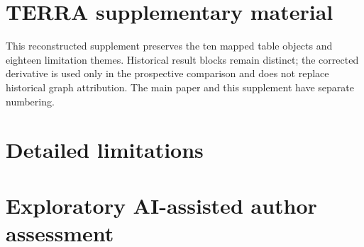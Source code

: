 \documentclass[10pt]{article}
\begin{document}
\section*{TERRA supplementary material}
This reconstructed supplement preserves the ten mapped table objects and eighteen limitation themes. Historical result blocks remain distinct; the corrected derivative is used only in the prospective comparison and does not replace historical graph attribution. The main paper and this supplement have separate numbering.
\clearpage
\begingroup\small

\endgroup
\clearpage
\begingroup\small

\endgroup
\clearpage
\begingroup\small

\endgroup
\clearpage
\begingroup\small

\endgroup
\clearpage
\begingroup\small

\endgroup
\clearpage
\begingroup\small

\endgroup
\clearpage
\begingroup\small

\endgroup
\clearpage
\begingroup\small

\endgroup
\clearpage
\begingroup\small

\endgroup
\clearpage
\begingroup\small

\endgroup
\clearpage\section{Detailed limitations}\begin{enumerate}\end{enumerate}
\section{Exploratory AI-assisted author assessment}


\end{document}
